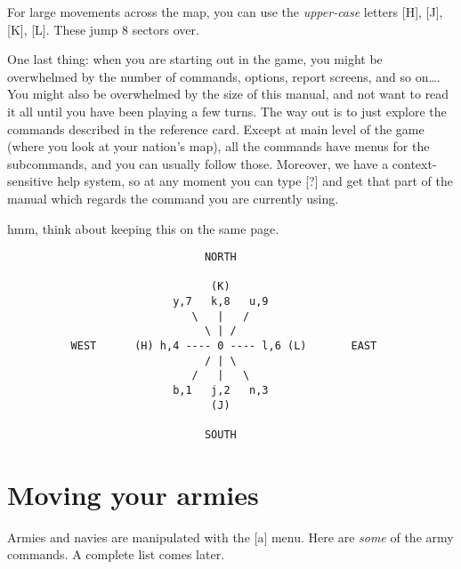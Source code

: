 For large movements across the map, you can use the \emph{upper-case}
letters [H], [J], [K], [L].  These jump 8 sectors over.

One last thing: when you are starting out in the game, you might be
overwhelmed by the number of commands, options, report screens, and so
on\dots{}.  You might also be overwhelmed by the size of this manual,
and not want to read it all until you have been playing a few turns.
The way out is to just explore the commands described in the reference
card.  Except at main level of the game (where you look at your
nation's map), all the commands have menus for the subcommands, and
you can usually follow those.  Moreover, we have a context-sensitive
help system, so at any moment you can type [?] and get that part of
the manual which regards the command you are currently using.

\comment hmm, think about keeping this on the same page.
\comment \newpage
\begin{verbatim}
                               NORTH

                                (K)
                          y,7   k,8   u,9
                             \   |   /
                               \ | /
          WEST      (H) h,4 ---- 0 ---- l,6 (L)       EAST
                               / | \
                             /   |   \
                          b,1   j,2   n,3
                                (J)

                               SOUTH
\end{verbatim}

\section{Moving your armies}
Armies and navies are manipulated with the [a] menu.  Here are
\emph{some} of the army commands.  A complete list comes later.

